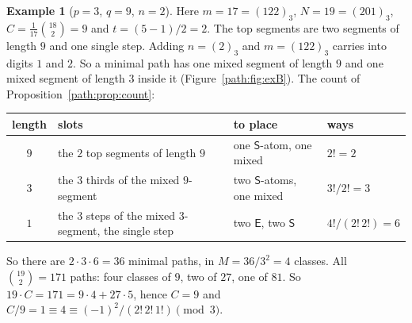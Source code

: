 \documentclass[11pt]{article}
\theoremstyle{definition}
\newtheorem{example}[theorem]{Example}
\theoremstyle{remark}
\numberwithin{equation}{section}
\numberwithin{figure}{section}
\newcommand{\E}{\textsf{E}}
\newcommand{\Ss}{\textsf{S}}
\begin{document}
\begin{example}[$p=3$, $q=9$, $n=2$]\label{path:ex:B}
Here $m=17=(122)_3$, $N=19=(201)_3$, $C=\frac1{17}\binom{18}2=9$ and $t=(5-1)/2=2$. The top segments are two
segments of length $9$ and one single step. Adding $n=(2)_3$ and $m=(122)_3$ carries into digits $1$ and $2$.
So a minimal path has one mixed segment of length $9$ and one mixed segment of length $3$ inside it
(Figure~\ref{path:fig:exB}). The count of Proposition~\ref{path:prop:count}:

\begin{center}\small
\begin{tabular}{@{}clll@{}}
\toprule
length & slots & to place & ways\\
\midrule
$9$ & the $2$ top segments of length $9$ & one $\Ss$-atom, one mixed & $2!=2$\\
$3$ & the $3$ thirds of the mixed $9$-segment & two $\Ss$-atoms, one mixed & $3!/2!=3$\\
$1$ & the $3$ steps of the mixed $3$-segment, the single step & two $\E$, two $\Ss$ & $4!/(2!\,2!)=6$\\
\bottomrule
\end{tabular}
\end{center}

So there are $2\cdot3\cdot6=36$ minimal paths, in $M=36/3^2=4$ classes. All $\binom{19}2=171$ paths: four classes
of $9$, two of $27$, one of $81$. So $19\cdot C=171=9\cdot4+27\cdot5$, hence $C=9$ and
$C/9=1\equiv4\equiv(-1)^2/(2!\,2!\,1!)\pmod3$.
\end{example}
\end{document}
